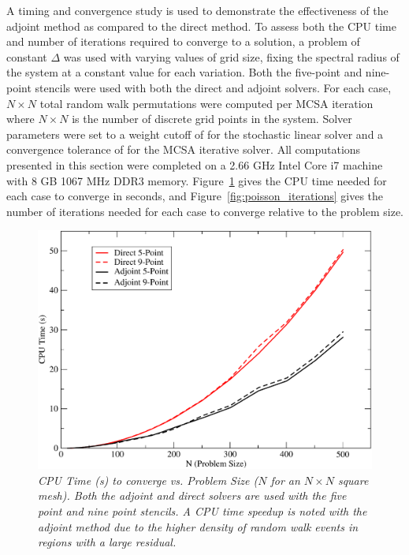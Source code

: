 \documentclass[preprint,12pt]{elsarticle}
\begin{document}
A timing and convergence study is used to demonstrate the
effectiveness of the adjoint method as compared to the direct
method. To assess both the CPU time and number of iterations required
to converge to a solution, a problem of constant $\Delta$ was used
with varying values of grid size, fixing the spectral radius of the
system at a constant value for each variation. Both the five-point and
nine-point stencils were used with both the direct and adjoint
solvers. For each case, $N \times N$ total random walk permutations
were computed per MCSA iteration where $N \times N$ is the number of
discrete grid points in the system. Solver parameters were set to a
weight cutoff of  for the stochastic linear solver and a
convergence tolerance of  for the MCSA iterative solver. All
computations presented in this section were completed on a 2.66 GHz
Intel Core i7 machine with 8 GB 1067 MHz DDR3
memory. Figure~\ref{fig:poisson_cpu_time} gives the CPU time needed
for each case to converge in seconds, and
Figure~\ref{fig:poisson_iterations} gives the number of iterations
needed for each case to converge relative to the problem size.
\begin{figure}[ht!]
  \centering
  \includegraphics[width=5in,clip]{dir_adj_cpu.pdf}
  \caption{\sl CPU Time (s) to converge vs. Problem Size ($N$ for an
    $N \times N$ square mesh). Both the adjoint and direct solvers are
    used with the five point and nine point stencils. A CPU time
    speedup is noted with the adjoint method due to the higher density
    of random walk events in regions with a large residual.}
  \label{fig:poisson_cpu_time}
\end{figure}
\end{document}
